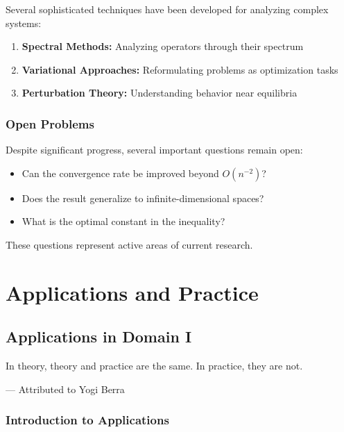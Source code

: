 \documentclass[11pt,twoside,openright]{book}
\theoremstyle{plain}
\theoremstyle{definition}
\theoremstyle{remark}
\begin{document}
Several sophisticated techniques have been developed for analyzing complex systems:

\begin{enumerate}[itemsep=0.3em]
    \item \textbf{Spectral Methods:} Analyzing operators through their spectrum
    \item \textbf{Variational Approaches:} Reformulating problems as optimization tasks
    \item \textbf{Perturbation Theory:} Understanding behavior near equilibria
\end{enumerate}

\section{Open Problems}
\label{sec:adv-open}

Despite significant progress, several important questions remain open:

\begin{itemize}[itemsep=0.3em]
    \item Can the convergence rate be improved beyond $O(n^{-2})$?
    \item Does the result generalize to infinite-dimensional spaces?
    \item What is the optimal constant in the inequality?
\end{itemize}

These questions represent active areas of current research.

\part{Applications and Practice}

\chapter{Applications in Domain I}
\label{ch:applications1}

\epigraph{In theory, theory and practice are the same. In practice, they are not.}{--- Attributed to Yogi Berra}

\section{Introduction to Applications}
\label{sec:app1-intro}
\end{document}
